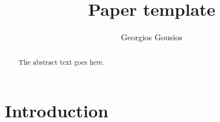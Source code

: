 \documentclass{article}
\begin{document}
\newcommand{\todo}[1]{\textbf{TODO}\footnote{\textbf{TODO:} #1}}

\title{Paper template}
\author{Georgios Gousios}

\maketitle

\begin{abstract}
The abstract text goes here.
\end{abstract}

\section{Introduction}



\end{document}
